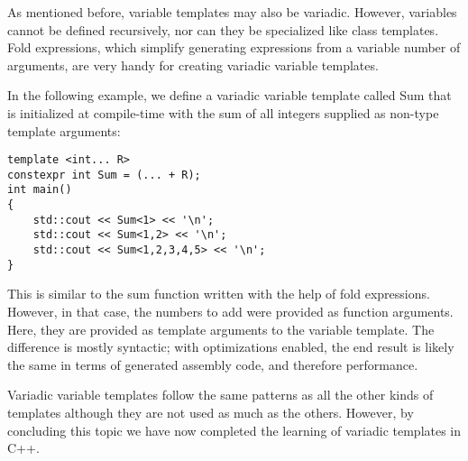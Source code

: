 As mentioned before, variable templates may also be variadic. However, variables cannot be defined recursively, nor can they be specialized like class templates. Fold expressions, which simplify generating expressions from a variable number of arguments, are very handy for creating variadic variable templates.

In the following example, we define a variadic variable template called Sum that is initialized at compile-time with the sum of all integers supplied as non-type template arguments:

\begin{lstlisting}[style=styleCXX]
template <int... R>
constexpr int Sum = (... + R);
int main()
{
	std::cout << Sum<1> << '\n';
	std::cout << Sum<1,2> << '\n';
	std::cout << Sum<1,2,3,4,5> << '\n';
}
\end{lstlisting}

This is similar to the sum function written with the help of fold expressions. However, in that case, the numbers to add were provided as function arguments. Here, they are provided as template arguments to the variable template. The difference is mostly syntactic; with optimizations enabled, the end result is likely the same in terms of generated assembly code, and therefore performance.

Variadic variable templates follow the same patterns as all the other kinds of templates although they are not used as much as the others. However, by concluding this topic we have now completed the learning of variadic templates in C++.















































